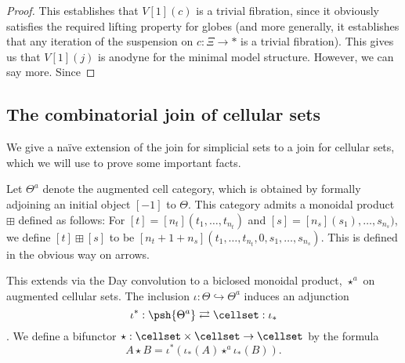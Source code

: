 \begin{proof}
This establishes that \(V[1](c)\) is a trivial fibration, since it obviously satisfies the required lifting property for globes (and more generally, it establishes that any iteration of the suspension on \(c:\Xi\to \ast\) is a trivial fibration).   This gives us that \(V[1](j)\) is anodyne for the minimal model structure.   However, we can say more.  Since 
\end{proof}

\subsection{The combinatorial join of cellular sets}
We give a na\"ive extension of the join for simplicial sets to a join for cellular sets, which we will use to prove some important facts.

Let \(\Theta^a\) denote the augmented cell category, which is obtained by formally adjoining an initial object \([-1]\) to \(\Theta\).  This category admits a monoidal product \(\boxplus\) defined as follows: For \([t]=[n_t](t_1,\dots,t_{n_t})\) and \([s]=[n_s](s_1),\dots,s_{n_s})\), we define \([t]\boxplus [s]\) to be \([n_t+1+n_s](t_1,\dots,t_{n_t},0,s_1,\dots,s_{n_s})\).  This is defined in the obvious way on arrows.  

This extends via the Day convolution to a biclosed monoidal product, \(\star^a\) on augmented cellular sets.  The inclusion \(\iota:\Theta\hookrightarrow \Theta^a\) induces an adjunction \[\iota^\ast:\psh{\Theta^a}\rightleftarrows \cellset:\iota_\ast\].  We define a bifunctor \(\star:\cellset\times\cellset \to \cellset\) by the formula
\[A\star B=\iota^\ast(\iota_\ast(A)\star^a \iota_\ast(B)).\]

